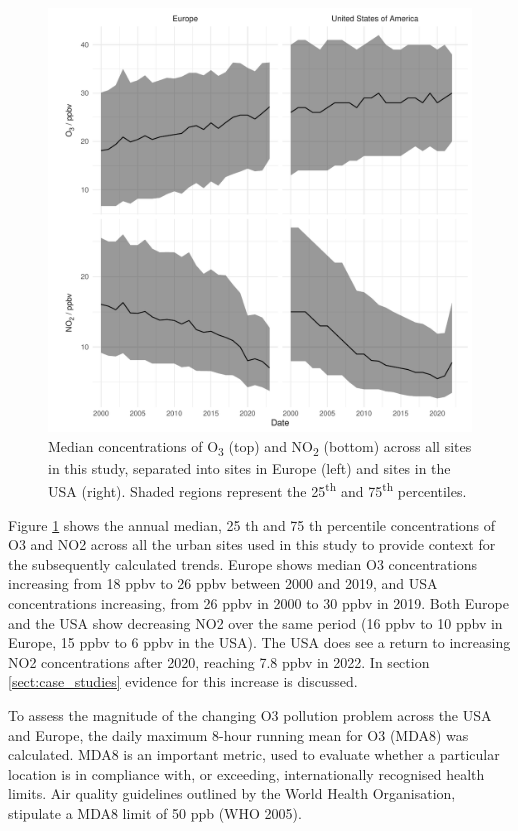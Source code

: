 \documentclass[journal abbreviation, manuscript]{copernicus}
\begin{document}
\begin{figure}[t]
\includegraphics[width=12cm]{figures/f2_conc.pdf}
\caption{Median concentrations of O\textsubscript{3} (top) and NO\textsubscript{2} (bottom) across all sites in this study, separated into sites in Europe (left) and sites in the USA (right).  Shaded regions represent the 25\textsuperscript{th} and 75\textsuperscript{th} percentiles.}
\label{fig:conc_plot}
\end{figure}

Figure \ref{fig:conc_plot} shows the annual median, 25 th and 75 th percentile concentrations of O3 and NO2 across all the urban sites used in this study to provide context for the subsequently calculated trends. Europe shows median O3 concentrations increasing from 18 ppbv to 26 ppbv between 2000 and 2019, and USA concentrations increasing, from 26 ppbv in 2000 to 30 ppbv in 2019. Both Europe and the USA show decreasing NO2 over the same period (16 ppbv to 10 ppbv in Europe, 15 ppbv to 6 ppbv in the USA). The USA does see a return to increasing NO2 concentrations after 2020, reaching 7.8 ppbv in 2022. In section \ref{sect:case_studies} evidence for this increase is discussed. 

To assess the magnitude of the changing O3 pollution problem across the USA and Europe, the daily maximum 8-hour running mean for O3 (MDA8) was calculated. MDA8 is an important metric, used to evaluate whether a particular location is in compliance with, or exceeding, internationally recognised health limits. Air quality guidelines outlined by the World Health Organisation, stipulate a MDA8 limit of 50 ppb (WHO 2005).
\end{document}
